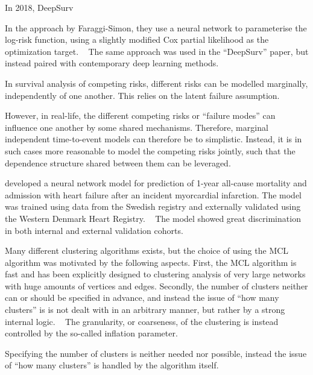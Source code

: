 
In 2018, DeepSurv 

In the approach by Faraggi-Simon, they use a neural network to 
parameterise the log-risk function, using a slightly modified Cox partial 
likelihood as the optimization target.
~\autocite{faraggiNeural1995}
The same approach was used in the \enquote{DeepSurv} paper,
but instead paired with contemporary deep learning methods.
~\autocite{katzmanDeepSurv2018a}


In survival analysis of competing risks, 
different risks can be modelled marginally,
independently of one another.
This relies on the latent failure assumption.

However, in real-life, the different competing risks 
or \enquote{failure modes} can influence one another
by some shared mechanisms.
Therefore, marginal independent time-to-event models
can therefore be to simplistic.
Instead, it is in such cases
more reasonable to model the competing risks jointly,
such that the dependence structure shared between them
can be leveraged.




\textcite{mohammadDevelopment2022} developed a neural network model
for prediction of 1-year all-cause mortality and admission with heart failure 
after an incident myorcardial infarction.
The model was trained using data from the Swedish 
registry and externally validated using the Western Denmark
Heart Registry.
~\autocite{mohammadDevelopment2022}
The model showed great discrimination in both internal and external
validation cohorts.



Many different clustering algorithms exists, 
but the choice of using the \ac{MCL} algorithm was motivated by 
the following aspects. 
First, the \ac{MCL} algorithm is fast and has been explicitly designed 
to clustering analysis of very large networks with huge amounts 
of vertices and edges.
Secondly, the number of clusters neither can or should be specified in
advance, and instead the issue of \enquote{how many clusters} is
is not dealt with in an arbitrary manner, but
rather by a strong internal logic.
~\autocite{vandongenGraph2008}
The granularity, or coarseness, of the clustering is instead controlled 
by the so-called inflation parameter.


Specifying the number of clusters is neither needed nor possible, 
instead the issue of \enquote{how many clusters} is handled by the
algorithm itself.



